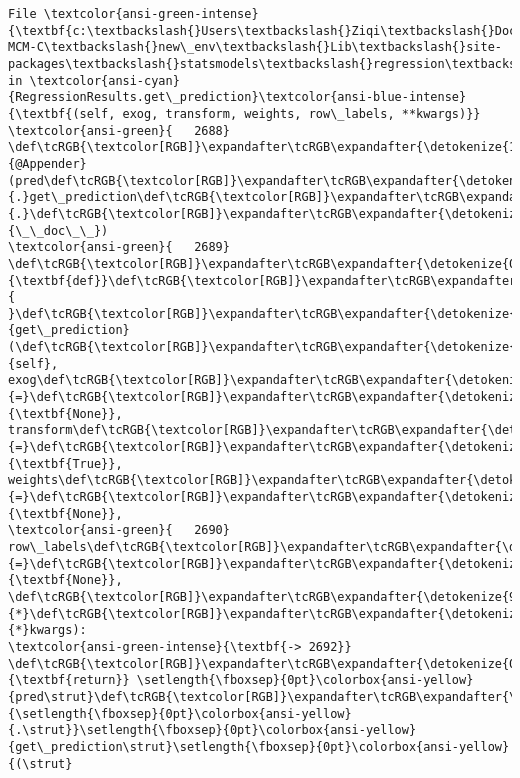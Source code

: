 \documentclass[11pt]{article}
\begin{document}
\begin{Verbatim}[commandchars=\\\{\}, frame=single, framerule=2mm, rulecolor=\color{outerrorbackground}]
File \textcolor{ansi-green-intense}{\textbf{c:\textbackslash{}Users\textbackslash{}Ziqi\textbackslash{}Documents\textbackslash{}Python\textbackslash{}2025-MCM-C\textbackslash{}new\_env\textbackslash{}Lib\textbackslash{}site-packages\textbackslash{}statsmodels\textbackslash{}regression\textbackslash{}linear\_model.py:2692}}, in \textcolor{ansi-cyan}{RegressionResults.get\_prediction}\textcolor{ansi-blue-intense}{\textbf{(self, exog, transform, weights, row\_labels, **kwargs)}}
\textcolor{ansi-green}{   2688} \def\tcRGB{\textcolor[RGB]}\expandafter\tcRGB\expandafter{\detokenize{175,0,255}}{@Appender}(pred\def\tcRGB{\textcolor[RGB]}\expandafter\tcRGB\expandafter{\detokenize{98,98,98}}{.}get\_prediction\def\tcRGB{\textcolor[RGB]}\expandafter\tcRGB\expandafter{\detokenize{98,98,98}}{.}\def\tcRGB{\textcolor[RGB]}\expandafter\tcRGB\expandafter{\detokenize{0,0,135}}{\_\_doc\_\_})
\textcolor{ansi-green}{   2689} \def\tcRGB{\textcolor[RGB]}\expandafter\tcRGB\expandafter{\detokenize{0,135,0}}{\textbf{def}}\def\tcRGB{\textcolor[RGB]}\expandafter\tcRGB\expandafter{\detokenize{188,188,188}}{ }\def\tcRGB{\textcolor[RGB]}\expandafter\tcRGB\expandafter{\detokenize{0,0,255}}{get\_prediction}(\def\tcRGB{\textcolor[RGB]}\expandafter\tcRGB\expandafter{\detokenize{0,135,0}}{self}, exog\def\tcRGB{\textcolor[RGB]}\expandafter\tcRGB\expandafter{\detokenize{98,98,98}}{=}\def\tcRGB{\textcolor[RGB]}\expandafter\tcRGB\expandafter{\detokenize{0,135,0}}{\textbf{None}}, transform\def\tcRGB{\textcolor[RGB]}\expandafter\tcRGB\expandafter{\detokenize{98,98,98}}{=}\def\tcRGB{\textcolor[RGB]}\expandafter\tcRGB\expandafter{\detokenize{0,135,0}}{\textbf{True}}, weights\def\tcRGB{\textcolor[RGB]}\expandafter\tcRGB\expandafter{\detokenize{98,98,98}}{=}\def\tcRGB{\textcolor[RGB]}\expandafter\tcRGB\expandafter{\detokenize{0,135,0}}{\textbf{None}},
\textcolor{ansi-green}{   2690}                    row\_labels\def\tcRGB{\textcolor[RGB]}\expandafter\tcRGB\expandafter{\detokenize{98,98,98}}{=}\def\tcRGB{\textcolor[RGB]}\expandafter\tcRGB\expandafter{\detokenize{0,135,0}}{\textbf{None}}, \def\tcRGB{\textcolor[RGB]}\expandafter\tcRGB\expandafter{\detokenize{98,98,98}}{*}\def\tcRGB{\textcolor[RGB]}\expandafter\tcRGB\expandafter{\detokenize{98,98,98}}{*}kwargs):
\textcolor{ansi-green-intense}{\textbf{-> 2692}}     \def\tcRGB{\textcolor[RGB]}\expandafter\tcRGB\expandafter{\detokenize{0,135,0}}{\textbf{return}} \setlength{\fboxsep}{0pt}\colorbox{ansi-yellow}{pred\strut}\def\tcRGB{\textcolor[RGB]}\expandafter\tcRGB\expandafter{\detokenize{98,98,98}}{\setlength{\fboxsep}{0pt}\colorbox{ansi-yellow}{.\strut}}\setlength{\fboxsep}{0pt}\colorbox{ansi-yellow}{get\_prediction\strut}\setlength{\fboxsep}{0pt}\colorbox{ansi-yellow}{(\strut}

\end{Verbatim}
\end{document}
